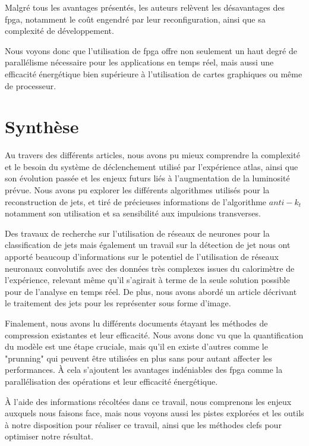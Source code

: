Malgré tous les avantages présentés, les auteurs relèvent les désavantages des \acrshort{fpga}, notamment le coût engendré par leur reconfiguration, ainsi que sa complexité de développement.

Nous voyons donc que l'utilisation de \acrshort{fpga} offre non seulement un haut degré de parallélisme nécessaire pour les applications en temps réel, mais aussi une efficacité énergétique bien supérieure à l'utilisation de cartes graphiques ou même de processeur.

\section{Synthèse}

Au travers des différents articles, nous avons pu mieux comprendre la complexité et le besoin du système de déclenchement utilisé par l'expérience \acrshort{atlas}, ainsi que son évolution passée et les enjeux futurs liés à l'augmentation de la luminosité prévue. Nous avons pu explorer les différents algorithmes utilisés pour la reconstruction de jets, et tiré de précieuses informations de l'algorithme $anti-k_t$ notamment son utilisation et sa sensibilité aux impulsions transverses.

Des travaux de recherche sur l'utilisation de réseaux de neurones pour la classification de jets mais également un travail sur la détection de jet nous ont apporté beaucoup d'informations sur le potentiel de l'utilisation de réseaux neuronaux convolutifs avec des données très complexes issues du calorimètre de l'expérience, relevant même qu'il s'agirait à terme de la seule solution possible pour de l'analyse en temps réel. De plus, nous avons abordé un article décrivant le traitement des jets pour les représenter sous forme d'image.

Finalement, nous avons lu différents documents étayant les méthodes de compression existantes et leur efficacité. Nous avons donc vu que la quantification du modèle est une étape cruciale, mais qu'il en existe d'autres comme le "prunning" qui peuvent être utilisées en plus sans pour autant affecter les performances. À cela s'ajoutent les avantages indéniables des \acrshort{fpga} comme la parallélisation des opérations et leur efficacité énergétique.

À l'aide des informations récoltées dans ce travail, nous comprenons les enjeux auxquels nous faisons face, mais nous voyons aussi les pistes explorées et les outils à notre disposition pour réaliser ce travail, ainsi que les méthodes clefs pour optimiser notre résultat.



